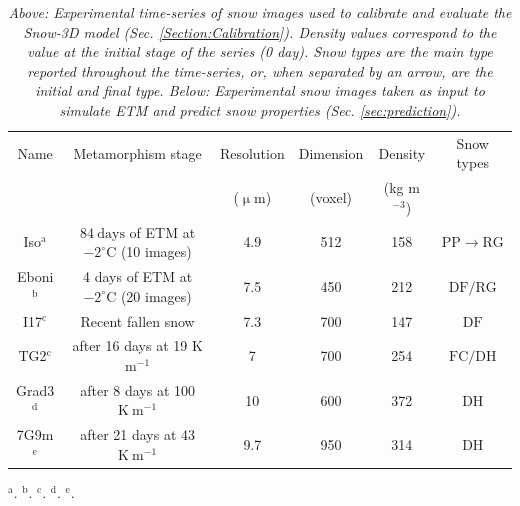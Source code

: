 \documentclass[draft,ms]{agujournal2019}
\begin{document}
\begin{table}
\caption{\textit{Above: Experimental time-series of snow images used to calibrate and evaluate the Snow-3D model (Sec. \ref{Section:Calibration}). Density values correspond to the value at the initial stage of the series (0 day). Snow types are the main type reported throughout the time-series, or, when separated by an arrow, are the initial and final type. Below: Experimental snow images taken as input to simulate ETM and predict snow properties (Sec. \ref{sec:prediction}).}}
\begin{tabular}{|c|c|c|c|c|c|}
\hline Name & Metamorphism stage & Resolution & Dimension & Density & Snow types \\
 &  & ($\upmu$m) &(voxel) & (kg m$^{-3}$) &  \\
\hline 
Iso$^\mathrm{a}$ & $84\ \mathrm{days}$ of ETM at $-2^{\circ} \mathrm{C}$ (10 images) & 4.9 & 512 & 158 & \small{$\mathrm{PP} \rightarrow \mathrm{RG}$}\\
Eboni$^\mathrm{b}$ & 4 days of ETM at $-2^{\circ} \mathrm{C}$ (20 images) & 7.5 & 450 & 212 & \small{$\mathrm{DF/RG}$}\\
\hline\hline 
I17$^\mathrm{c}$ & Recent fallen snow & 7.3 & 700 & 147 & \small{$\mathrm{DF}$} \\
TG2$^\mathrm{c}$ & after 16 days at 19 K m$^{-1}$ & 7 & 700 & 254 & \small{$\mathrm{FC} / \mathrm{DH}$} \\
Grad3$^\mathrm{d}$ & after 8 days at 100 $\mathrm{K}\ \mathrm{m}^{-1}$ & 10 & 600 & 372 & \small{$\mathrm{DH}$} \\
7G9m$^\mathrm{e}$ & after 21 days at 43 $\mathrm{K}\ \mathrm{m}^{-1}$ & 9.7 & 950 & 314 & \small{$\mathrm{DH}$} \\
\hline
\end{tabular}
\label{tab:series}
$^\mathrm{a}$\protect{}. $^\mathrm{b}$\protect{}.
$^\mathrm{c}$\protect{}.  $^\mathrm{d}$\protect{}. $^\mathrm{e}$\protect{}.
\end{table}
\end{document}
